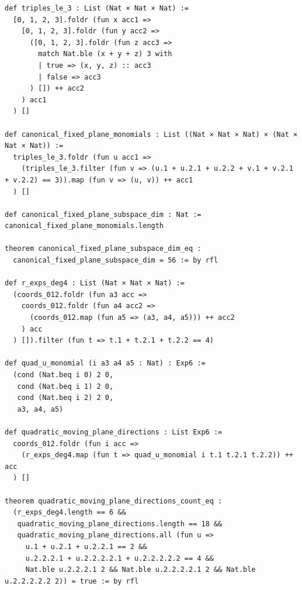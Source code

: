 \documentclass[11pt,a4paper]{article}
\begin{document}
\begin{lstlisting}[caption={Fixed-plane subspace and quadratic moving-plane directions in \texttt{HodgeVerification.lean}.}]
def triples_le_3 : List (Nat × Nat × Nat) :=
  [0, 1, 2, 3].foldr (fun x acc1 =>
    [0, 1, 2, 3].foldr (fun y acc2 =>
      ([0, 1, 2, 3].foldr (fun z acc3 =>
        match Nat.ble (x + y + z) 3 with
        | true => (x, y, z) :: acc3
        | false => acc3
      ) []) ++ acc2
    ) acc1
  ) []

def canonical_fixed_plane_monomials : List ((Nat × Nat × Nat) × (Nat × Nat × Nat)) :=
  triples_le_3.foldr (fun u acc1 =>
    (triples_le_3.filter (fun v => (u.1 + u.2.1 + u.2.2 + v.1 + v.2.1 + v.2.2) == 3)).map (fun v => (u, v)) ++ acc1
  ) []

def canonical_fixed_plane_subspace_dim : Nat := canonical_fixed_plane_monomials.length

theorem canonical_fixed_plane_subspace_dim_eq :
  canonical_fixed_plane_subspace_dim = 56 := by rfl

def r_exps_deg4 : List (Nat × Nat × Nat) :=
  (coords_012.foldr (fun a3 acc =>
    coords_012.foldr (fun a4 acc2 =>
      (coords_012.map (fun a5 => (a3, a4, a5))) ++ acc2
    ) acc
  ) []).filter (fun t => t.1 + t.2.1 + t.2.2 == 4)

def quad_u_monomial (i a3 a4 a5 : Nat) : Exp6 :=
  (cond (Nat.beq i 0) 2 0,
   cond (Nat.beq i 1) 2 0,
   cond (Nat.beq i 2) 2 0,
   a3, a4, a5)

def quadratic_moving_plane_directions : List Exp6 :=
  coords_012.foldr (fun i acc =>
    (r_exps_deg4.map (fun t => quad_u_monomial i t.1 t.2.1 t.2.2)) ++ acc
  ) []

theorem quadratic_moving_plane_directions_count_eq :
  (r_exps_deg4.length == 6 &&
   quadratic_moving_plane_directions.length == 18 &&
   quadratic_moving_plane_directions.all (fun u =>
     u.1 + u.2.1 + u.2.2.1 == 2 &&
     u.2.2.2.1 + u.2.2.2.2.1 + u.2.2.2.2.2 == 4 &&
     Nat.ble u.2.2.2.1 2 && Nat.ble u.2.2.2.2.1 2 && Nat.ble u.2.2.2.2.2 2)) = true := by rfl
\end{lstlisting}
\end{document}
